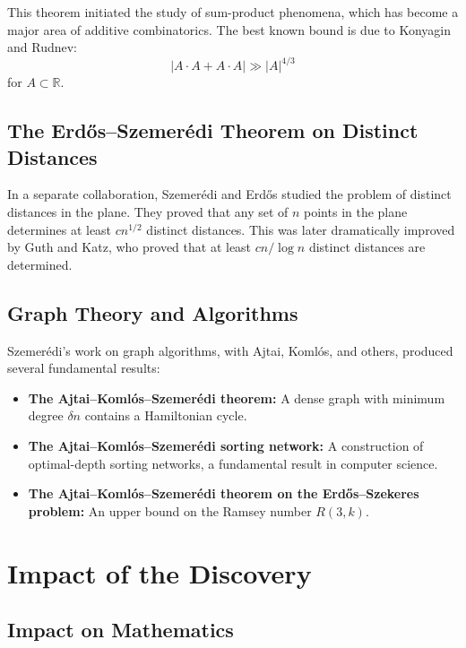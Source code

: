 This theorem initiated the study of sum-product phenomena, which has become a major area of additive combinatorics. The best known bound is due to Konyagin and Rudnev:
\[
|A \cdot A + A \cdot A| \gg |A|^{4/3}
\]
for $A \subset \mathbb{R}$.

\subsection{The Erd\H{o}s--Szemer\'edi Theorem on Distinct Distances}

In a separate collaboration, Szemer\'edi and Erd\H{o}s studied the problem of distinct distances in the plane. They proved that any set of $n$ points in the plane determines at least $cn^{1/2}$ distinct distances. This was later dramatically improved by Guth and Katz, who proved that at least $c n / \log n$ distinct distances are determined.

\subsection{Graph Theory and Algorithms}

Szemer\'edi's work on graph algorithms, with Ajtai, Koml\'os, and others, produced several fundamental results:
\begin{itemize}
\item \textbf{The Ajtai--Koml\'os--Szemer\'edi theorem:} A dense graph with minimum degree $\delta n$ contains a Hamiltonian cycle.
\item \textbf{The Ajtai--Koml\'os--Szemer\'edi sorting network:} A construction of optimal-depth sorting networks, a fundamental result in computer science.
\item \textbf{The Ajtai--Koml\'os--Szemer\'edi theorem on the Erd\H{o}s--Szekeres problem:} An upper bound on the Ramsey number $R(3,k)$.
\end{itemize}

\section{Impact of the Discovery}

\subsection{Impact on Mathematics}

